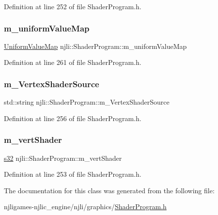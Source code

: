 Definition at line 252 of file Shader\+Program.\+h.

\mbox{\label{classnjli_1_1_shader_program_a20e228a576a90ddd2e232fa490cde560}} 
\subsubsection{\texorpdfstring{m\+\_\+uniform\+Value\+Map}{m\_uniformValueMap}}
{\footnotesize\ttfamily \mbox{\hyperlink{classnjli_1_1_shader_program_a36ecea1b480769cf2a125e5fb13f122a}{Uniform\+Value\+Map}} njli\+::\+Shader\+Program\+::m\+\_\+uniform\+Value\+Map\hspace{0.3cm}{\ttfamily [private]}}



Definition at line 261 of file Shader\+Program.\+h.

\mbox{\label{classnjli_1_1_shader_program_a36b6891a72ec4e6f7ee89add79884282}} 
\subsubsection{\texorpdfstring{m\+\_\+\+Vertex\+Shader\+Source}{m\_VertexShaderSource}}
{\footnotesize\ttfamily std\+::string njli\+::\+Shader\+Program\+::m\+\_\+\+Vertex\+Shader\+Source\hspace{0.3cm}{\ttfamily [private]}}



Definition at line 256 of file Shader\+Program.\+h.

\mbox{\label{classnjli_1_1_shader_program_a8f1c16c8132f6680d0fd8e7cd0f53ad9}} 
\subsubsection{\texorpdfstring{m\+\_\+vert\+Shader}{m\_vertShader}}
{\footnotesize\ttfamily \mbox{\hyperlink{_util_8h_aa62c75d314a0d1f37f79c4b73b2292e2}{s32}} njli\+::\+Shader\+Program\+::m\+\_\+vert\+Shader\hspace{0.3cm}{\ttfamily [private]}}



Definition at line 253 of file Shader\+Program.\+h.



The documentation for this class was generated from the following file\+:\begin{DoxyCompactItemize}
\item 
njligames-\/njlic\+\_\+engine/njli/graphics/\mbox{\hyperlink{_shader_program_8h}{Shader\+Program.\+h}}\end{DoxyCompactItemize}
